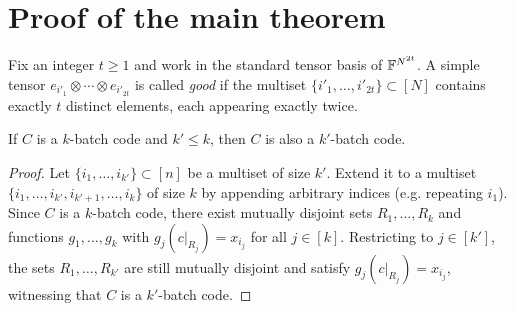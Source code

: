 \chapter{Proof of the main theorem}


\begin{definition}
  \label{def:good-tensor}
  Fix an integer $t \ge 1$ and work in the standard tensor basis of
  $\mathbb{F}^{N^{2t}}$. A simple tensor $e_{i'_1} \otimes \cdots \otimes e_{i'_{2t}}$
  is called \emph{good} if the multiset $\{i'_1, \dots, i'_{2t}\} \subset [N]$
  contains exactly $t$ distinct elements, each appearing exactly twice.
\end{definition}

\begin{lemma}
  \label{lem:batch-monotone}
  If $C$ is a $k$-batch code and $k' \le k$, then $C$ is also a $k'$-batch code.
\end{lemma}
\begin{proof}
  Let $\{i_1, \dots, i_{k'}\} \subset [n]$ be a multiset of size $k'$. Extend it
  to a multiset $\{i_1, \dots, i_{k'}, i_{k'+1}, \dots, i_k\}$ of size $k$ by
  appending arbitrary indices (e.g. repeating $i_1$). Since $C$ is a $k$-batch
  code, there exist mutually disjoint sets $R_1, \dots, R_k$ and functions
  $g_1, \dots, g_k$ with $g_j(c|_{R_j}) = x_{i_j}$ for all $j \in [k]$.
  Restricting to $j \in [k']$, the sets $R_1, \dots, R_{k'}$ are still mutually
  disjoint and satisfy $g_j(c|_{R_j}) = x_{i_j}$, witnessing that $C$ is a
  $k'$-batch code.
\end{proof}

